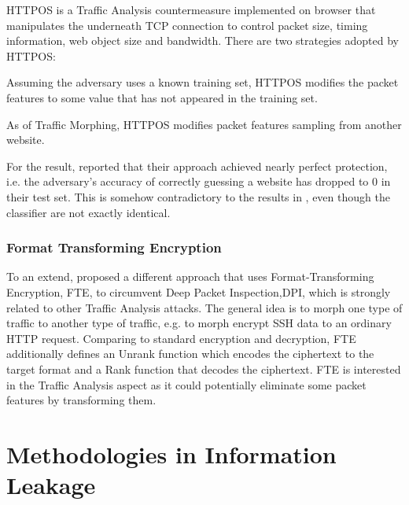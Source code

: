 HTTPOS\cite{HTTPOS} is a Traffic Analysis countermeasure implemented on browser that manipulates the underneath TCP connection to control packet size, timing information, web object size and bandwidth. There are two strategies adopted by HTTPOS:
\begin{description}[style=nextline]
	\item[The Diffusion Strategy]
	 Assuming the adversary uses a known training set, HTTPOS modifies the packet features to some value that has not appeared in the training set.
	\item[The Confusion Strategy]
	As of Traffic Morphing, HTTPOS modifies packet features sampling from another website.
\end{description}

For the result, \cite{HTTPOS} reported that their approach achieved nearly perfect protection, i.e. the adversary's accuracy of correctly guessing a website has  dropped to 0 in their test set. This is somehow contradictory to the results in \cite{Peekaboo}, even though the classifier are not exactly identical.

\subsubsection{Format Transforming Encryption}

To an extend, \cite{FTE} proposed a different approach that uses Format-Transforming Encryption, FTE, to circumvent Deep Packet Inspection,DPI, which is strongly related to other Traffic Analysis attacks. The general idea is to morph one type of traffic to another type of traffic, e.g. to morph encrypt SSH data to an ordinary HTTP request. Comparing to standard encryption and decryption, FTE additionally defines an Unrank function which encodes the ciphertext to the target format and a Rank function that decodes the ciphertext. FTE is interested in the Traffic Analysis aspect as it could potentially eliminate some packet features by transforming them.

\section{Methodologies in Information Leakage }



